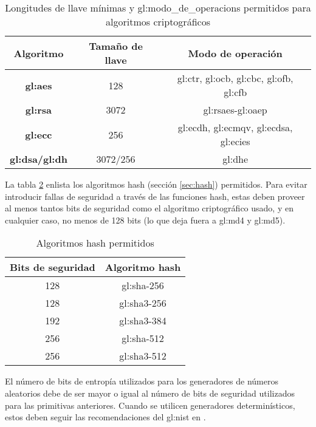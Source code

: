 \begin{table}
  \centering
  \begin{tabular}{| c | c | c |}
    \hline
    \textbf{Algoritmo} &
    \textbf{Tamaño de llave} &
    \textbf{Modo de operación} \\ [0.5ex]
    \hline
    \textbf{\gls{gl:aes}} &
    128 &
    \acrshort{gl:ctr},
    \acrshort{gl:ocb},
    \acrshort{gl:cbc},
    \acrshort{gl:ofb},
    \acrshort{gl:cfb} \\
    \hline
    \textbf{\gls{gl:rsa}} &
    3072 &
    \acrshort{gl:rsaes}-\acrshort{gl:oaep} \\
    \hline
    \textbf{\gls{gl:ecc}} &
    256 &
    \acrshort{gl:ecdh},
    \acrshort{gl:ecmqv},
    \acrshort{gl:ecdsa},
    \acrshort{gl:ecies} \\
    \hline
    \textbf{\gls{gl:dsa}/\gls{gl:dh}} &
    3072/256 &
    \acrshort{gl:dhe}\\
    \hline
  \end{tabular}
  \caption{Longitudes de llave mínimas y \glspl{gl:modo_de_operacion}
      permitidos para algoritmos criptográficos}
  \label{minimo_llaves}
\end{table}

La tabla \ref{hash_permitidos} enlista los algoritmos hash (sección
\ref{sec:hash}) permitidos. Para evitar introducir fallas de seguridad a
través de las funciones hash, estas deben proveer al menos tantos bits de
seguridad como el algoritmo criptográfico usado, y en cualquier caso, no
menos de 128 bits (lo que deja fuera a \gls{gl:md4} y \gls{gl:md5}).

\begin{table}
  \centering
  \begin{tabular}{| c | c |}
    \hline
    \textbf{Bits de seguridad} &
    \textbf{Algoritmo hash} \\ [0.5ex]
    \hline
    128 & \gls{gl:sha}-256 \\
    \hline
    128 & \gls{gl:sha}3-256 \\
    \hline
    192 & \gls{gl:sha}3-384 \\
    \hline
    256 & \gls{gl:sha}-512 \\
    \hline
    256 & \gls{gl:sha}3-512 \\
    \hline
  \end{tabular}
  \caption{Algoritmos hash permitidos}
  \label{hash_permitidos}
\end{table}

El número de bits de entropía utilizados para los generadores de números
aleatorios debe de ser mayor o igual al número de bits de seguridad utilizados
para las primitivas anteriores. Cuando se utilicen generadores determinísticos,
estos deben seguir las recomendaciones del \gls{gl:nist} en
\cite{nist_aleatorios}.
